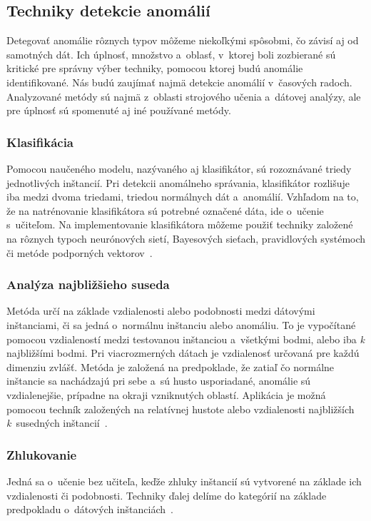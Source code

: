 \documentclass[a4paper,twoside,slovak,12pt,appendix]{article}
\begin{document}
\subsection{Techniky detekcie anomálií}
\label{c:analysis-techniques}
Detegovať anomálie rôznych typov môžeme niekoľkými spôsobmi, čo závisí aj od
samotných dát. Ich úplnosť, množstvo a~oblasť, v~ktorej boli zozbierané sú
kritické pre správny výber techniky, pomocou ktorej budú anomálie
identifikované. Nás budú zaujímať najmä detekcie anomálií v~časových radoch.
Analyzované metódy sú najmä z~oblasti strojového učenia a~dátovej analýzy, ale
pre úplnosť sú spomenuté aj iné používané metódy.

\subsubsection{Klasifikácia}
Pomocou naučeného modelu, nazývaného aj klasifikátor, sú rozoznávané triedy
jednotlivých inštancií. Pri detekcii anomálneho správania, klasifikátor
rozlišuje iba medzi dvoma triedami, triedou normálnych dát a~anomálií. Vzhľadom
na to, že na natrénovanie klasifikátora sú potrebné označené dáta, ide o~učenie
s~učiteľom. Na implementovanie klasifikátora môžeme použiť techniky založené na
rôznych typoch neurónových sietí, Bayesových sieťach, pravidlových systémoch či
metóde podporných vektorov~\cite{Chandola2009,Tan2005}.

\subsubsection{Analýza najbližšieho suseda}
Metóda určí na základe vzdialenosti alebo podobnosti medzi dátovými inštanciami,
či sa jedná o~normálnu inštanciu alebo anomáliu. To je vypočítané pomocou
vzdialeností medzi testovanou inštanciou a~všetkými bodmi, alebo iba \textit{k}
najbližšími bodmi. Pri viacrozmerných dátach je vzdialenosť určovaná pre
každú dimenziu zvlášť. Metóda je založená na predpoklade, že zatiaľ čo normálne
inštancie sa nachádzajú pri sebe a~sú husto usporiadané, anomálie sú
vzdialenejšie, prípadne na okraji vzniknutých oblastí. Aplikácia je možná
pomocou techník založených na relatívnej hustote alebo vzdialenosti najbližších
\textit{k}~susedných inštancií~\cite{Chandola2009,Tan2005}.

\subsubsection{Zhlukovanie}
\label{c:clustering}
Jedná sa o~učenie bez učiteľa, keďže zhluky inštancií sú vytvorené na základe
ich vzdialenosti či podobnosti. Techniky ďalej delíme do kategórií na základe
predpokladu o~dátových inštanciách~\cite{Chandola2009,Tan2005}.
\end{document}
